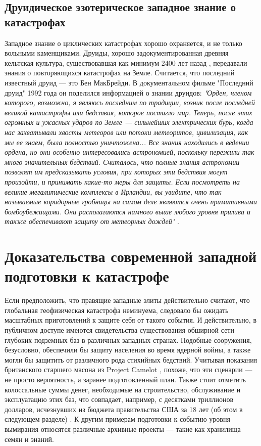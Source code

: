 \documentclass[10pt,twocolumn,letterpaper]{article}
\begin{document}
\subsection{Друидическое эзотерическое западное знание о катастрофах}

Западное знание о циклических катастрофах хорошо охраняется, и не только вольными каменщиками. Друиды, хорошо задокументированная древняя кельтская культура, существовавшая как минимум 2400 лет назад \cite{7}, передавали знания о повторяющихся катастрофах на Земле. Считается, что последний известный друид — это Бен МакБрейди. В документальном фильме "Последний друид" 1992 года он поделился информацией о знании друидов: \textit{"Орден, членом которого, возможно, я являюсь последним по традиции, возник после последней великой катастрофы или бедствия, которое постигло мир. Теперь, после этих огромных и ужасных ударов по Земле — сильнейших электрических бурь, когда нас захватывали хвосты метеоров или потоки метеоритов, цивилизация, как мы ее знаем, была полностью уничтожена... Все знания находились в ведении ордена, но они особенно интересовались астрономией, поскольку пережили так много значительных бедствий. Считалось, что полные знания астрономии позволят им предсказывать условия, при которых эти бедствия могут произойти, и принимать какие-то меры для защиты. Если посмотреть на великие мегалитические комплексы в Ирландии, вы увидите, что так называемые коридорные гробницы на самом деле являются очень примитивными бомбоубежищами. Они располагаются намного выше любого уровня прилива и также обеспечивают защиту от метеорных дождей"} \cite{8,9}.


\section{Доказательства современной западной подготовки к катастрофе}

Если предположить, что правящие западные элиты действительно считают, что глобальная геофизическая катастрофа неминуема, следовало бы ожидать масштабных приготовлений к защите себя от такого события. И действительно, в публичном доступе имеются свидетельства существования обширной сети глубоких подземных баз в различных западных странах. Подобные сооружения, безусловно, обеспечили бы защиту населения во время ядерной войны, а также могли бы защитить от различного рода стихийных бедствий. Учитывая показания британского старшего масона из Project Camelot \cite{4,6}, похоже, что эти сценарии — не просто вероятность, а заранее подготовленный план. Также стоит отметить колоссальные суммы денег, необходимые на строительство, обслуживание и эксплуатацию этих баз, что совпадает, например, с десятками триллионов долларов, исчезнувших из бюджета правительства США за 18 лет (об этом в следующем разделе) \cite{11,12,13}. К другим примерам подготовки к событию уровня вымирания относятся различные архивные проекты — такие как хранилища семян и знаний.
\end{document}
